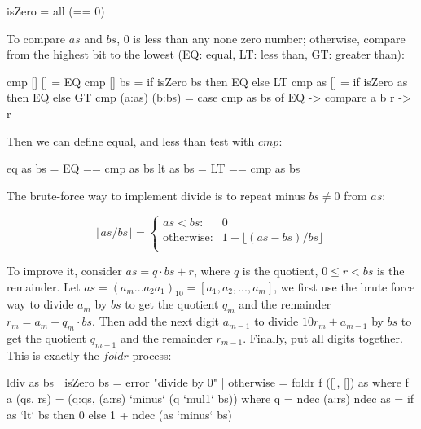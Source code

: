 \documentclass[b5paper]{article}
\begin{document}
\begin{Answer}[ref = {ex:list-others}]
{\begin{Haskell}
isZero = all (== 0)
\end{Haskell}

To compare $as$ and $bs$, 0 is less than any none zero number; otherwise, compare from the highest bit to the lowest (EQ: equal, LT: less than, GT: greater than):

\begin{Haskell}
cmp [] [] = EQ
cmp [] bs = if isZero bs then EQ else LT
cmp as [] = if isZero as then EQ else GT
cmp (a:as) (b:bs) = case cmp as bs of EQ -> compare a b
                                      r -> r
\end{Haskell}

Then we can define equal, and less than test with $cmp$:

\begin{Haskell}
eq as bs = EQ == cmp as bs
lt as bs = LT == cmp as bs
\end{Haskell}

The brute-force way to implement divide is to repeat minus $bs \neq 0$ from $as$:

\[
\lfloor as / bs \rfloor = \begin{cases}
as < bs: & 0 \\
\text{otherwise}: & 1 + \lfloor (as - bs) / bs \rfloor \\
\end{cases}
\]

To improve it, consider $as = q \cdot bs + r$, where $q$ is the quotient, $0 \leq r < bs$ is the remainder. Let $as = (a_m...a_2a_1)_{10} = [a_1, a_2, ..., a_m]$, we first use the brute force way to divide $a_m$ by $bs$ to get the quotient $q_m$ and the remainder $r_m = a_m - q_m \cdot bs$. Then add the next digit $a_{m-1}$ to divide $10 r_{m} + a_{m-1}$ by $bs$ to get the quotient $q_{m-1}$ and the remainder $r_{m-1}$. Finally, put all digits together. This is exactly the $foldr$ process:

\begin{Haskell}
ldiv as bs | isZero bs = error "divide by 0"
           | otherwise = foldr f ([], []) as where
  f a (qs, rs) = (q:qs, (a:rs) `minus` (q `mul1` bs)) where
    q =  ndec (a:rs)
  ndec as = if as `lt` bs then 0 else 1 + ndec (as `minus` bs)
\end{Haskell}
}

\end{Answer}
\end{document}
